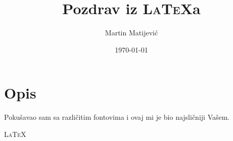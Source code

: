 \documentclass{memoir}
\begin{document}
\title{Pozdrav iz \textsc{\HUGE\LaTeX}a}
\author{Martin Matijević}
\date{\today}

\maketitle

\section{Opis}

Pokušavao sam sa različitim fontovima i ovaj mi je bio najsličniji Vašem.
\bigskip

\textsc{\HUGE\LaTeX}
\end{document}
